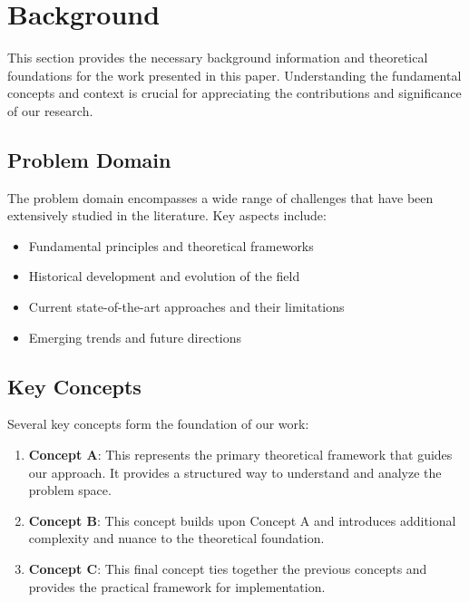 \section{Background}

This section provides the necessary background information and theoretical foundations for the work presented in this paper. Understanding the fundamental concepts and context is crucial for appreciating the contributions and significance of our research.

\subsection{Problem Domain}

The problem domain encompasses a wide range of challenges that have been extensively studied in the literature. Key aspects include:

\begin{itemize}
    \item Fundamental principles and theoretical frameworks
    \item Historical development and evolution of the field
    \item Current state-of-the-art approaches and their limitations
    \item Emerging trends and future directions
\end{itemize}

\subsection{Key Concepts}

Several key concepts form the foundation of our work:

\begin{enumerate}
    \item \textbf{Concept A}: This represents the primary theoretical framework that guides our approach. It provides a structured way to understand and analyze the problem space.

    \item \textbf{Concept B}: This concept builds upon Concept A and introduces additional complexity and nuance to the theoretical foundation.

    \item \textbf{Concept C}: This final concept ties together the previous concepts and provides the practical framework for implementation.
\end{enumerate}

